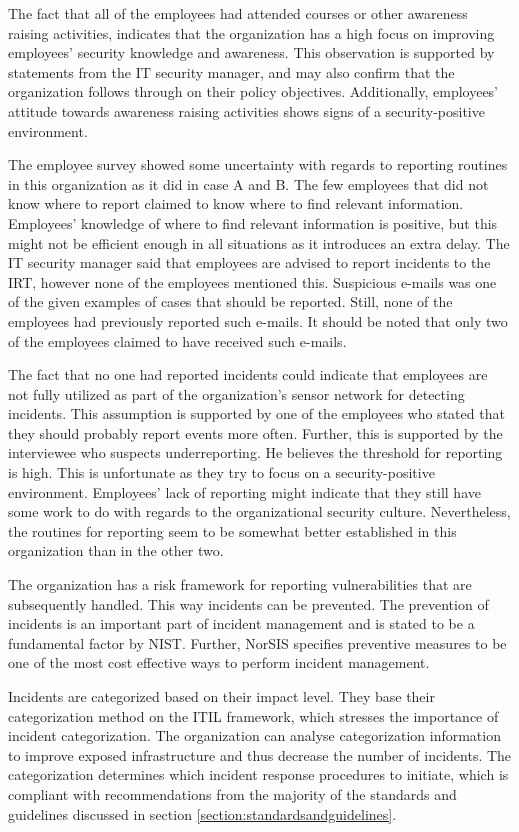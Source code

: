 The fact that all of the employees had attended courses or other awareness raising activities, indicates that the organization has a high focus on improving employees' security knowledge and awareness. This observation is supported by statements from the IT security manager, and may also confirm that the organization follows through on their policy objectives. Additionally, employees' attitude towards awareness raising activities shows signs of a security-positive environment.  
 
The employee survey showed some uncertainty with regards to reporting routines in this organization as it did in case A and B. The few employees that did not know where to report claimed to know where to find relevant information. Employees' knowledge of where to find relevant information is positive, but this might not be efficient enough in all situations as it introduces an extra delay. The IT security manager said that employees are advised to report incidents to the \ac{IRT}, however none of the employees mentioned this. Suspicious e-mails was one of the given examples of cases that should be reported. Still, none of the employees had previously reported such e-mails. It should be noted that only two of the employees claimed to have received such e-mails. 

The fact that no one had reported incidents could indicate that employees are not fully utilized as part of the organization's sensor network for detecting incidents. This assumption is supported by one of the employees who stated that they should probably report events more often. Further, this is supported by the interviewee who suspects underreporting. He believes the threshold for reporting is high. This is unfortunate as they try to focus on a security-positive environment. Employees' lack of reporting might indicate that they still have some work to do with regards to the organizational security culture. Nevertheless, the routines for reporting seem to be somewhat better established in this organization than in the other two. 

The organization has a risk framework for reporting vulnerabilities that are subsequently handled. This way incidents can be prevented. The prevention of incidents is an important part of incident management and is stated to be a fundamental factor by NIST. Further, NorSIS specifies preventive measures to be one of the most cost effective ways to perform incident management. 

Incidents are categorized based on their impact level. They base their categorization method on the ITIL framework, which stresses the importance of incident categorization. The organization can analyse categorization information to improve exposed infrastructure and thus decrease the number of incidents. The categorization determines which incident response procedures to initiate, which is compliant with recommendations from the majority of the standards and guidelines discussed in section \ref{section:standardsandguidelines}.

